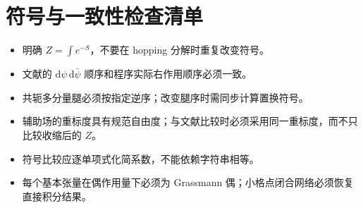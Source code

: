 \documentclass[UTF8,11pt]{ctexart}
\newcommand{\dd}{\mathrm{d}}
\begin{document}
\section{符号与一致性检查清单}
\begin{itemize}
 \item 明确 $Z=\int e^{-S}$，不要在 hopping 分解时重复改变符号。
 \item 文献的 $\dd\psi\,\dd\bar\psi$ 顺序和程序实际右作用顺序必须一致。
 \item 共轭多分量腿必须按指定逆序；改变腿序时需同步计算置换符号。
 \item 辅助场的重标度具有规范自由度；与文献比较时必须采用同一重标度，而不只比较收缩后的 $Z$。
 \item 符号比较应逐单项式化简系数，不能依赖字符串相等。
 \item 每个基本张量在偶作用量下必须为 Grassmann 偶；小格点闭合网络必须恢复直接积分结果。
\end{itemize}
\end{document}
